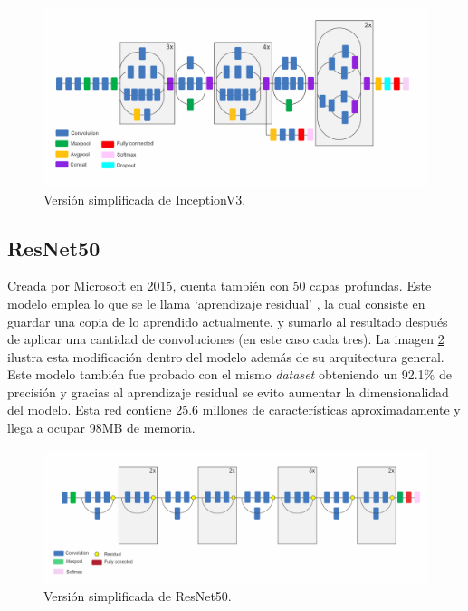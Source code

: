 \begin{figure}[h!]
\includegraphics[width=1\textwidth]{images/InceptionV3.png}
\centering
\caption{Versión simplificada de InceptionV3. \protect\cite{modelos} }
\label{Inceptionv3}
\end{figure}

\subsection{ResNet50}
Creada por Microsoft en 2015, cuenta también con 50 capas profundas. Este modelo emplea lo que se le llama `aprendizaje residual' \cite{He2015}, la cual consiste en guardar una copia de lo aprendido actualmente, y sumarlo al resultado después de aplicar una cantidad de convoluciones (en este caso cada tres). La imagen \ref{ResNet} ilustra esta modificación dentro del modelo además de su arquitectura general. Este modelo también fue probado con el mismo \textit{dataset} obteniendo un 92.1\% de precisión y gracias al aprendizaje residual se evito aumentar la dimensionalidad del modelo. Esta red contiene 25.6 millones de características aproximadamente y llega a ocupar 98MB de memoria. 

\begin{figure}[h!]
\includegraphics[width=1\textwidth]{images/ResNet.png}
\centering
\caption{Versión simplificada de ResNet50. \protect\cite{modelos} }
\label{ResNet}
\end{figure}


